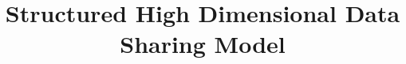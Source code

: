 \documentclass[]{article}
\title{Structured High Dimensional Data Sharing Model}
\author{}
\begin{document}
	
	\maketitle
	
	
	\begin{abstract}
		
	\end{abstract}
	
	
	
	
	
	
	
	
	
	
	
	
	
\end{document}
